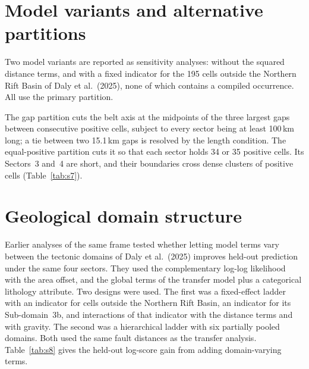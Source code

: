 \documentclass[11pt]{article}
\begin{document}
\section{Model variants and alternative partitions}
\label{sec:s6}

Two model variants are reported as sensitivity analyses: without the squared distance terms, and with a fixed indicator for the 195 cells outside the Northern Rift Basin of Daly et al.\ (2025), none of which contains a compiled occurrence. All use the primary partition.

\begin{table}[ht]
\centering
\small
\caption{Leave-one-sector-out results for the primary model and the two model variants. Brier skill is relative to the training base rate; ``Slope'' is the calibration slope.}
\label{tab:s6}

\end{table}

The gap partition cuts the belt axis at the midpoints of the three largest gaps between consecutive positive cells, subject to every sector being at least 100\,km long; a tie between two 15.1\,km gaps is resolved by the length condition. The equal-positive partition cuts it so that each sector holds 34 or 35 positive cells. Its Sectors~3 and~4 are short, and their boundaries cross dense clusters of positive cells (Table~\ref{tab:s7}).

\begin{table}[ht]
\centering
\small
\caption{Alternative partitions: sector composition and leave-one-sector-out results for the primary model.}
\label{tab:s7}
\resizebox{\textwidth}{!}{}
\end{table}

\section{Geological domain structure}
\label{sec:s7}

Earlier analyses of the same frame tested whether letting model terms vary between the tectonic domains of Daly et al.\ (2025) improves held-out prediction under the same four sectors. They used the complementary log-log likelihood with the area offset, and the global terms of the transfer model plus a categorical lithology attribute. Two designs were used. The first was a fixed-effect ladder with an indicator for cells outside the Northern Rift Basin, an indicator for its Sub-domain~3b, and interactions of that indicator with the distance terms and with gravity. The second was a hierarchical ladder with six partially pooled domains. Both used the same fault distances as the transfer analysis. Table~\ref{tab:s8} gives the held-out log-score gain from adding domain-varying terms.
\end{document}
